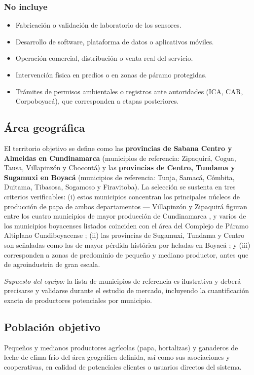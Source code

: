 \documentclass[11pt,a4paper]{article}
\newcommand{\supuesto}[1]{\textit{Supuesto del equipo: #1}}
\begin{document}
\subsubsection{No incluye}
\begin{itemize}
\item Fabricación o validación de laboratorio de los sensores.
\item Desarrollo de software, plataforma de datos o aplicativos móviles.
\item Operación comercial, distribución o venta real del servicio.
\item Intervención física en predios o en zonas de páramo protegidas.
\item Trámites de permisos ambientales o registros ante autoridades (ICA, CAR, Corpoboyacá), que corresponden a etapas posteriores.
\end{itemize}

\subsection{Área geográfica}
\label{sec:area-geografica}
El territorio objetivo se define como las \textbf{provincias de Sabana Centro y Almeidas en Cundinamarca} (municipios de referencia: Zipaquirá, Cogua, Tausa, Villapinzón y Chocontá) y las \textbf{provincias de Centro, Tundama y Sugamuxi en Boyacá} (municipios de referencia: Tunja, Samacá, Cómbita, Duitama, Tibasosa, Sogamoso y Firavitoba). La selección se sustenta en tres criterios verificables: (i) estos municipios concentran los principales núcleos de producción de papa de ambos departamentos --- Villapinzón y Zipaquirá figuran entre los cuatro municipios de mayor producción de Cundinamarca \citep{portalnews_papa}, y varios de los municipios boyacenses listados coinciden con el área del Complejo de Páramo Altiplano Cundiboyacense \citep{corpoboyaca_paramo}; (ii) las provincias de Sugamuxi, Tundama y Centro son señaladas como las de mayor pérdida histórica por heladas en Boyacá \citep{boyaca7dias2026}; y (iii) corresponden a zonas de predominio de pequeño y mediano productor, antes que de agroindustria de gran escala.

\supuesto{} la lista de municipios de referencia es ilustrativa y deberá precisarse y validarse durante el estudio de mercado, incluyendo la cuantificación exacta de productores potenciales por municipio.

\subsection{Población objetivo}
Pequeños y medianos productores agrícolas (papa, hortalizas) y ganaderos de leche de clima frío del área geográfica definida, así como sus asociaciones y cooperativas, en calidad de potenciales clientes o usuarios directos del sistema.
\end{document}
